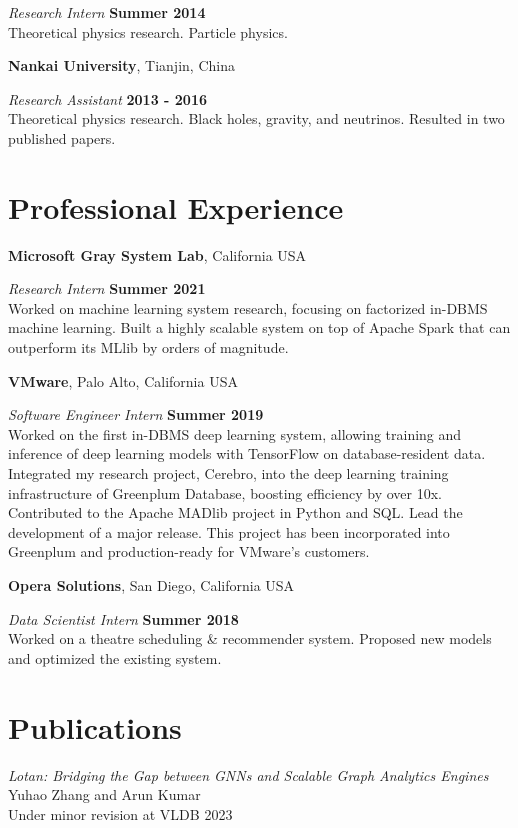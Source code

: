 \documentclass[margin,line]{res}
\begin{document}
\begin{resume}
\vspace{-.3cm}
{\em Research Intern} \hfill {\bf Summer 2014}\\
Theoretical physics research. Particle physics.

{\bf Nankai University}, Tianjin, China

\vspace{-.3cm}
{\em Research Assistant} \hfill {\bf 2013 - 2016}\\
Theoretical physics research. Black holes, gravity, and neutrinos. Resulted in two published papers.

\section{\sc Professional Experience}
{\bf Microsoft Gray System Lab}, California USA

\vspace{-.3cm}
{\em Research Intern} \hfill {\bf Summer 2021}\\
Worked on machine learning system research, focusing on factorized in-DBMS machine learning. Built a highly scalable system on top of Apache Spark that can outperform its MLlib by orders of magnitude. 

{\bf VMware}, Palo Alto, California USA

\vspace{-.3cm}
{\em Software Engineer Intern} \hfill {\bf Summer 2019}\\
Worked on the first in-DBMS deep learning system, allowing training and inference of deep learning models with TensorFlow on database-resident data. Integrated my research project, Cerebro, into the deep learning training infrastructure of Greenplum Database, boosting efficiency by over 10x. Contributed to the Apache MADlib project in Python and SQL. Lead the development of a major release. This project has been incorporated into Greenplum and production-ready for VMware's customers.

{\bf Opera Solutions}, San Diego, California USA

\vspace{-.3cm}
{\em Data Scientist Intern} \hfill {\bf Summer 2018}\\
Worked on a theatre scheduling \& recommender system. Proposed new models and optimized the existing system.

\section{\sc Publications}
\textit{Lotan: Bridging the Gap between GNNs and Scalable Graph Analytics Engines}\\
Yuhao Zhang and Arun Kumar\\
Under minor revision at VLDB 2023



\end{resume}
\end{document}
